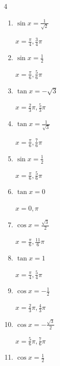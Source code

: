 \begin{multicols}{4}
\begin{enumerate}
        $\displaystyle x = \frac{4}{3}\pi , \frac{5}{3}\pi$

  \item $\displaystyle \sin{x}  = \frac{1}{\sqrt{2}}$

        $\displaystyle x = \frac{\pi}{4} , \frac{3}{4}\pi$

\columnbreak %

\resetques

  \item $\displaystyle \sin{x}  = \frac{1}{2}$

        $\displaystyle x = \frac{\pi}{6} , \frac{5}{6}\pi$

  \item $\displaystyle \tan{x}  = -\sqrt{3}$

        $\displaystyle x = \frac{2}{3}\pi , \frac{5}{3}\pi$

  \item $\displaystyle \tan{x}  = \frac{1}{\sqrt{3}}$

        $\displaystyle x = \frac{\pi}{6} , \frac{7}{6}\pi$

  \item $\displaystyle \sin{x}  = \frac{1}{2}$

        $\displaystyle x = \frac{\pi}{6} , \frac{5}{6}\pi$

  \item $\displaystyle \tan{x}  = 0$

        $\displaystyle x = 0 , \pi$

  \item $\displaystyle \cos{x}  = \frac{\sqrt{3}}{2}$

        $\displaystyle x = \frac{\pi}{6} , \frac{11}{6}\pi$

  \item $\displaystyle \tan{x}  = 1$

        $\displaystyle x = \frac{\pi}{4} , \frac{5}{4}\pi$

  \item $\displaystyle \cos{x}  = -\frac{1}{2}$

        $\displaystyle x = \frac{2}{3}\pi , \frac{4}{3}\pi$

  \item $\displaystyle \cos{x}  = -\frac{\sqrt{3}}{2}$

        $\displaystyle x = \frac{5}{6}\pi , \frac{7}{6}\pi$

  \item $\displaystyle \cos{x}  = \frac{1}{2}$


\end{enumerate}
\end{multicols}
